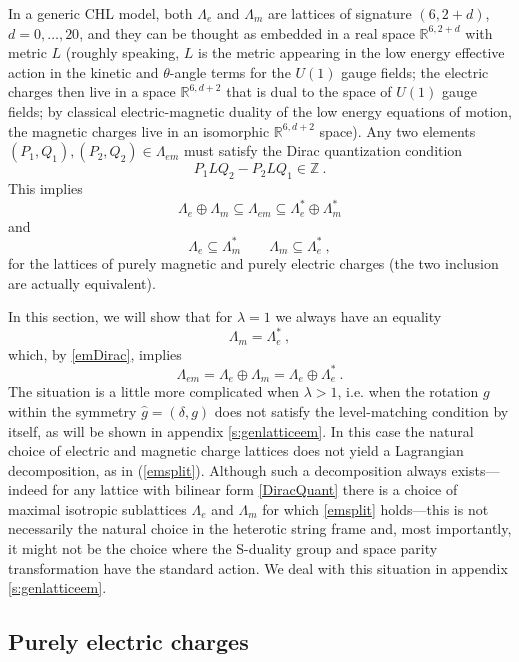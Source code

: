 \documentclass[a4paper,11pt]{article}
\newcommand{\RR}{\mathbb{R}}
\newcommand{\ZZ}{\mathbb{Z}}
\numberwithin{equation}{section}
\def\be{\begin{equation}}
\def\ee{\end{equation}}
\begin{document}
In a generic CHL model, both $\Lambda_e$ and $\Lambda_m$ are lattices of signature $(6,2+d)$, $d=0,\ldots,20$, and they can be thought as embedded in a real space $\RR^{6,2+d}$ with metric $L$ (roughly speaking, $L$ is the metric appearing in the low energy effective action in the kinetic and $\theta$-angle terms for the $U(1)$ gauge fields; the electric charges then live in a space $\RR^{6,d+2}$ that is dual to the space of $U(1)$ gauge fields; by classical electric-magnetic duality of the low energy equations of motion, the magnetic charges live in an isomorphic $\RR^{6,d+2}$ space).  Any two elements $(P_1,Q_1), (P_2,Q_2)\in \Lambda_{em}$ must satisfy the Dirac quantization condition
\be\label{DiracQuant} P_1 L Q_2 -P_2 L Q_1 \in \ZZ\ .
\ee This implies
\be\label{emDirac} \Lambda_e\oplus \Lambda_m\subseteq \Lambda_{em}\subseteq \Lambda_e^*\oplus \Lambda_m^*
\ee and
\be\label{eminclude} \Lambda_e\subseteq \Lambda_m^*\qquad \Lambda_m\subseteq \Lambda_e^*\ ,
\ee for the lattices of purely magnetic and purely electric charges (the two inclusion are actually equivalent). 

\medskip

In this section, we will show that for $\lambda=1$ we always have an equality
\be \Lambda_m=\Lambda_e^*\ ,
\ee which, by \eqref{emDirac}, implies
\be\label{emsplit} \Lambda_{em}=\Lambda_e\oplus\Lambda_m=\Lambda_e\oplus\Lambda_e^*\ .
\ee The situation is a little more complicated when $\lambda>1$, i.e. when the rotation $g$ within the symmetry $\hat g=(\delta,g)$ does not satisfy the level-matching condition by itself, as will be shown in appendix \ref{s:genlatticeem}. In this case the natural choice of electric and magnetic charge lattices does not yield a Lagrangian decomposition, as in (\ref{emsplit}). Although such a decomposition always exists---indeed for  any  lattice with bilinear form \eqref{DiracQuant}  there is  a choice of maximal isotropic sublattices $\Lambda_e$ and $\Lambda_m$ for which \eqref{emsplit} holds---this is not necessarily the natural choice in the heterotic string frame and, most importantly, it might not be the choice where the S-duality group and space parity transformation have the standard action. We deal with this situation in appendix \ref{s:genlatticeem}.

\subsection{Purely electric charges}
\end{document}

